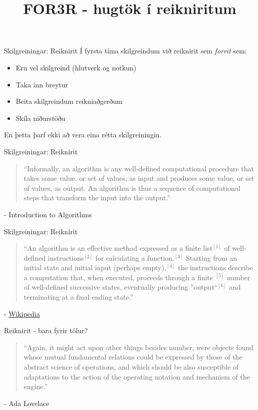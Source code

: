 \documentclass{beamer}
\title{FOR3R - hugtök í reikniritum}
\begin{document}
\begin{frame}
\titlepage
\end{frame}

\begin{frame}{Skilgreiningar: Reiknirit}
Í fyrsta tíma skilgreindum við reiknirit sem \emph{forrit} sem:
\begin{itemize}
  \item Eru vel skilgreind (hlutverk og notkun)
  \item Taka inn breytur
  \item Beita skilgreindum reikniaðgerðum
  \item Skila niðurstöðu
\end{itemize}
En þetta þarf ekki að vera eina rétta skilgreiningin.
\end{frame}

\begin{frame}{Skilgreiningar: Reiknirit}
\begin{quote}
``Informally, an algorithm is any well-defined computational procedure that takes
some value, or set of values, as input and produces some value, or set of values, as
output. An algorithm is thus a sequence of computational steps that transform the
input into the output.''
\end{quote} - Introduction to Algorithms
\end{frame}

\begin{frame}{Skilgreiningar: Reiknirit}
\begin{quote}
``An algorithm is an effective method expressed as a finite list$^{[1]}$ of well-defined instructions$^{[2]}$ for calculating a function.$^{[3]}$ Starting from an initial state and initial input (perhaps empty),$^{[4]}$ the instructions describe a computation that, when executed, proceeds through a finite $^{[5]}$ number of well-defined successive states, eventually producing ''output``$^{[6]}$ and terminating at a final ending state.''
\end{quote} - \href{http://en.wikipedia.org/wiki/Algorithm}{Wikipedia}
\end{frame}

\begin{frame}{Reiknirit - bara fyrir tölur?}
\begin{quote}
``Again, it might act upon other things besides number, were objects found whose mutual fundamental relations could be expressed by those of the abstract science of operations, and which should be also susceptible of adaptations to the action of the operating notation and mechanism of the engine.''
\end{quote} - Ada Lovelace
\end{frame}
\end{document}
